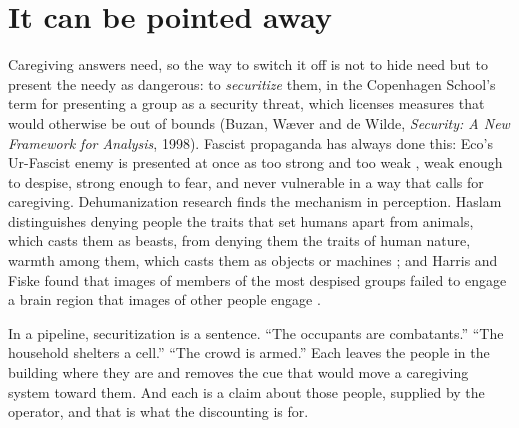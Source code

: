 \section{It can be pointed away}
\label{sec:20.8}
Caregiving answers need, so the way to switch it off is not to hide need but to present the needy as dangerous: to \emph{securitize} them, in the Copenhagen School's term for presenting a group as a security threat, which licenses measures that would otherwise be out of bounds (Buzan, Wæver and de Wilde, \emph{Security: A New Framework for Analysis}, 1998). Fascist propaganda has always done this: Eco's Ur-Fascist enemy is presented at once as too strong and too weak \autocite{eco1995urfascism}, weak enough to despise, strong enough to fear, and never vulnerable in a way that calls for caregiving. Dehumanization research finds the mechanism in perception. Haslam distinguishes denying people the traits that set humans apart from animals, which casts them as beasts, from denying them the traits of human nature, warmth among them, which casts them as objects or machines \autocite{haslam2006dehumanization}; and Harris and Fiske found that images of members of the most despised groups failed to engage a brain region that images of other people engage \autocite{harris2006dehumanizing}.

In a pipeline, securitization is a sentence. “The occupants are combatants.” “The household shelters a cell.” “The crowd is armed.” Each leaves the people in the building where they are and removes the cue that would move a caregiving system toward them. And each is a claim about those people, supplied by the operator, and that is what the discounting is for.
